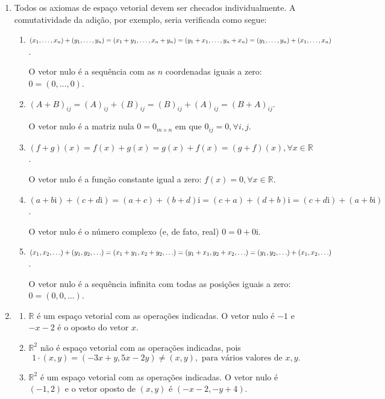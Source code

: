 \documentclass[12pt,a4paper]{article}
\newcommand\ii{\mathrm{i}}
\newcommand*\R{\mathbb{R}}
\begin{document}
\begin{enumerate}
\item Todos os axiomas de espaço vetorial devem ser checados individualmente. A comutatividade da adição, por exemplo, seria verificada como segue:
\begin{enumerate}
\item
$(x_1, \ldots, x_n) + (y_1, \ldots, y_n)
= (x_1 + y_1, \ldots, x_n + y_n) \\
= (y_1 + x_1, \ldots, y_n + x_n)
= (y_1, \ldots, y_n) + (x_1, \ldots, x_n)$.

O vetor nulo é a sequência com as $n$ coordenadas iguais a zero: $0 = (0, \ldots, 0)$.

\item
$(A + B)_{ij}
= (A)_{ij} + (B)_{ij}
= (B)_{ij} + (A)_{ij}
= (B + A)_{ij}$.

O vetor nulo é a matriz nula $0 = 0_{m \times n}$ em que $0_{ij} = 0, \forall i,j$. 

\item 
$(f + g)(x)
= f(x) + g(x)
= g(x) + f(x)
= (g + f)(x), \forall x \in \R$.

O vetor nulo é a função constante igual a zero: $f(x) = 0, \forall x \in \R$.

\item 
$(a + b \ii)+ (c + d \ii)
= (a + c) + (b + d) \ii
= (c + a) + (d + b) \ii
= (c + d \ii) + (a + b \ii)$.

O vetor nulo é o número complexo (e, de fato, real) $0 = 0 + 0 \ii$.

\item 
$(x_1, x_2, \ldots) + (y_1, y_2, \ldots)
= (x_1 + y_1, x_2 + y_2, \ldots) \\
= (y_1 + x_1, y_2 + x_2, \ldots)
= (y_1, y_2, \ldots) + (x_1, x_2, \ldots)$.

O vetor nulo é a sequência infinita com todas as posições iguais a zero: $0 = (0, 0, \ldots)$.

\end{enumerate}

\item 
\begin{enumerate}
\item $\R$ é um espaço vetorial com as operações indicadas. O vetor nulo é $-1$ e $-x-2$ é o oposto do vetor $x$.
\item $\R^2$ não é espaço vetorial com as operações indicadas, pois
\[1 \cdot(x,y) = (-3x+y,5x-2y) \neq (x,y), \text{ para vários valores de }x,y.\]
\item $\R^2$ é um espaço vetorial com as operações indicadas. O vetor nulo é $(-1, 2)$ e o vetor oposto de $(x,y)$ é $(-x-2, -y+4)$.
\end{enumerate}


\end{enumerate}
\end{document}
